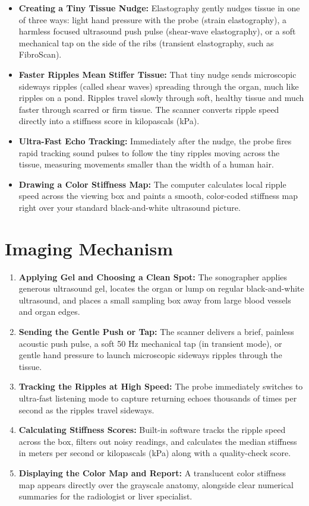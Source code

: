 \begin{itemize}
    \item \textbf{Creating a Tiny Tissue Nudge:} Elastography gently nudges tissue in one of three ways: light hand pressure with the probe (strain elastography), a harmless focused ultrasound push pulse (shear-wave elastography), or a soft mechanical tap on the side of the ribs (transient elastography, such as FibroScan).
    \item \textbf{Faster Ripples Mean Stiffer Tissue:} That tiny nudge sends microscopic sideways ripples (called shear waves) spreading through the organ, much like ripples on a pond. Ripples travel slowly through soft, healthy tissue and much faster through scarred or firm tissue. The scanner converts ripple speed directly into a stiffness score in kilopascals (kPa).
    \item \textbf{Ultra-Fast Echo Tracking:} Immediately after the nudge, the probe fires rapid tracking sound pulses to follow the tiny ripples moving across the tissue, measuring movements smaller than the width of a human hair.
    \item \textbf{Drawing a Color Stiffness Map:} The computer calculates local ripple speed across the viewing box and paints a smooth, color-coded stiffness map right over your standard black-and-white ultrasound picture.
\end{itemize}

\section{Imaging Mechanism}

\begin{enumerate}
    \item \textbf{Applying Gel and Choosing a Clean Spot:} The sonographer applies generous ultrasound gel, locates the organ or lump on regular black-and-white ultrasound, and places a small sampling box away from large blood vessels and organ edges.
    \item \textbf{Sending the Gentle Push or Tap:} The scanner delivers a brief, painless acoustic push pulse, a soft 50 Hz mechanical tap (in transient mode), or gentle hand pressure to launch microscopic sideways ripples through the tissue.
    \item \textbf{Tracking the Ripples at High Speed:} The probe immediately switches to ultra-fast listening mode to capture returning echoes thousands of times per second as the ripples travel sideways.
    \item \textbf{Calculating Stiffness Scores:} Built-in software tracks the ripple speed across the box, filters out noisy readings, and calculates the median stiffness in meters per second or kilopascals (kPa) along with a quality-check score.
    \item \textbf{Displaying the Color Map and Report:} A translucent color stiffness map appears directly over the grayscale anatomy, alongside clear numerical summaries for the radiologist or liver specialist.
\end{enumerate}

